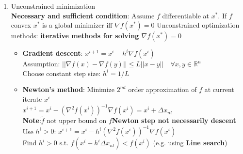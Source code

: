 \begin{enumerate}
    \item Unconstrained minimization\\
    \textbf{Necessary and sufficient condition}: Assume $f$ differentiable at $x^*$. If $f$ convex \rightarrow $x^*$ is a global minimizer iff $\nabla f(x^*)=0$
    \Rightarrow Unconstrained optimization methods: \textbf{iterative methods for solving $\nabla f(x^*)=0$}
    \begin{itemize}
        \item \textbf{Gradient descent}:
        $x^{i+1}=x^i-h^i\nabla f(x^i)$\\
        Assumption: $||\nabla f(x)-\nabla f(y)||\leq L||x-y|| \quad\forall x,y\in\mathbb{R}^n$\\
        \rightarrow Choose constant step size: $h^i=1/L$
        \item  \textbf{Newton's method}: Minimize $2^{nd}$ order approximation of $f$ at current iterate $x^i$\\
        \Rightarrow $x^{i+1}=x^i-(\nabla^2f(x^i))^{-1}\nabla f(x^i)=x^i+\Delta x_{nt}$\\
        \textbf{Note}:$\tilde{f}$ not upper bound on $f$\rightarrow \textbf{Newton step not necessarily descent}\\
        \rightarrow Use $h^i>0$: $x^{i+1}=x^i-h^i(\nabla^2f(x^i))^{-1}\nabla f(x^i)$\\
        \rightarrow Find $h^i>0$ s.t. $f(x^i+h^i\Delta x_{nt})<f(x^i)$ (e.g. using \textbf{Line search})
        

\end{itemize}
\end{enumerate}
